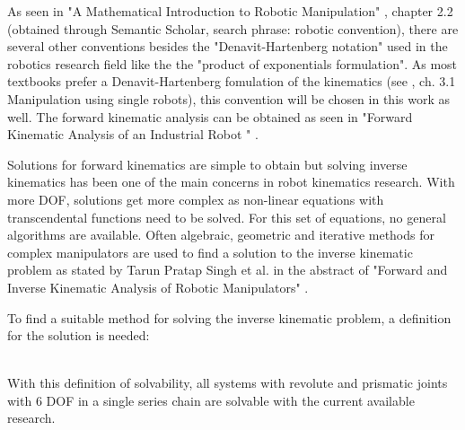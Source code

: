 As seen in "A Mathematical Introduction to Robotic Manipulation" \cite{MathIntroRobManip}, chapter 2.2 (obtained through Semantic Scholar, search phrase: robotic convention), there are several other conventions besides the "Denavit-Hartenberg notation" used in the robotics research field like the the "product of exponentials formulation".
As most textbooks prefer a Denavit-Hartenberg fomulation of the kinematics (see \cite{MathIntroRobManip}, ch. 3.1 Manipulation using single robots), this convention will be chosen in this work as well.
The forward kinematic analysis can be obtained as seen in "Forward Kinematic Analysis of an Industrial Robot " \cite{ConstantinForwardKA}.

Solutions for forward  kinematics are simple to obtain but solving inverse kinematics  has  been  one of  the  main  concerns  in  robot kinematics research. 
With more \ac{DOF}, solutions get more complex as non-linear equations with transcendental functions need to be solved. 
For this set of equations, no general algorithms are available.
Often algebraic, geometric and iterative methods for complex manipulators are used to find a solution to the inverse kinematic problem as stated by Tarun Pratap Singh et al. in the abstract of "Forward and Inverse Kinematic Analysis of Robotic Manipulators" \cite{FwdInvAnalysRobManip}.

To find a suitable method for solving the inverse kinematic problem, a definition for the solution is needed:\\
\medskip
\\
\bigskip

With this definition of solvability, all systems with revolute and prismatic \gls{joints} with 6 \ac{DOF}  in a single series chain are solvable with the current available research. \cite{invKinSeriallinkMani}
\\

